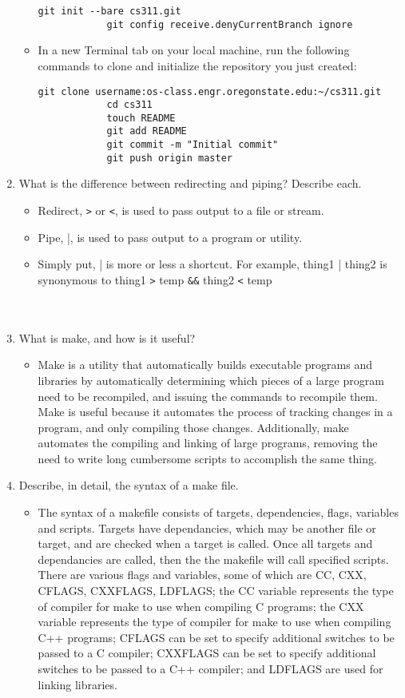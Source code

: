 \documentclass[12pt, letterpaper]{article}
\begin{document}
\begin{enumerate}
\begin{itemize}
\begin{lstlisting}[xleftmargin=-30.0ex]
			git init --bare cs311.git
			git config receive.denyCurrentBranch ignore
			\end{lstlisting}
			\item In a new Terminal tab on your local machine, run the following commands to clone and initialize the repository you just created:
			\begin{lstlisting}[xleftmargin=-30.0ex]
			git clone username:os-class.engr.oregonstate.edu:~/cs311.git
			cd cs311
			touch README
			git add README
			git commit -m "Initial commit"
			git push origin master
			\end{lstlisting}
		\end{itemize}
	\item What is the difference between redirecting and piping? Describe each. \hfill
		\begin{itemize}
			\item Redirect, \verb|>| or \verb|<|, is used to pass output to a file or stream.
			\item Pipe, |, is used to pass output to a program or utility.
			\item Simply put, | is more or less a shortcut. For example, thing1 | thing2 is synonymous to thing1 \verb|>| temp \verb|&&| thing2 \verb|<| temp \\\\\\
		\end{itemize}
	\item What is make, and how is it useful? \hfill
		\begin{itemize}
			\item Make is a utility that automatically builds executable programs and libraries by automatically determining which pieces of a large program need to be recompiled, and issuing the commands to recompile them. Make is useful because it automates the process of tracking changes in a program, and only compiling those changes. Additionally, make automates the compiling and linking of large programs, removing the need to write long cumbersome scripts to accomplish the same thing.
		\end{itemize}
	\item Describe, in detail, the syntax of a make file. \hfill
		\begin{itemize}
			\item The syntax of a makefile consists of targets, dependencies, flags, variables and scripts. Targets have dependancies, which may be another file or target, and are checked when a target is called. Once all targets and dependancies are called, then the the makefile will call specified scripts. There are various flags and variables, some of which are CC, CXX, CFLAGS, CXXFLAGS, LDFLAGS; the CC variable represents the type of compiler for make to use when compiling C programs; the CXX variable represents the type of compiler for make to use when compiling C++ programs; CFLAGS can be set to specify additional switches to be passed to a C compiler; CXXFLAGS can be set to specify additional switches to be passed to a C++ compiler; and LDFLAGS are used for linking libraries.

\end{itemize}
\end{enumerate}
\end{document}
